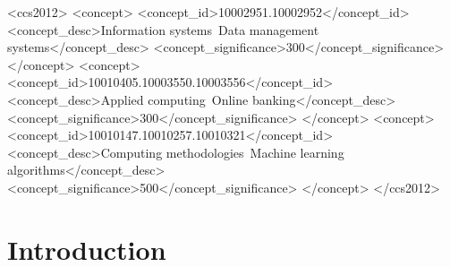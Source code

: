 \documentclass[sigconf, anonymous]{acmart}
\begin{document}
\begin{CCSXML}
<ccs2012>
   <concept>
       <concept_id>10002951.10002952</concept_id>
       <concept_desc>Information systems~Data management systems</concept_desc>
       <concept_significance>300</concept_significance>
       </concept>
   <concept>
       <concept_id>10010405.10003550.10003556</concept_id>
       <concept_desc>Applied computing~Online banking</concept_desc>
       <concept_significance>300</concept_significance>
       </concept>
   <concept>
       <concept_id>10010147.10010257.10010321</concept_id>
       <concept_desc>Computing methodologies~Machine learning algorithms</concept_desc>
       <concept_significance>500</concept_significance>
       </concept>
 </ccs2012>
\end{CCSXML}



\maketitle

\newcommand{\revised}[1]{{\color{magenta}{#1}}}

\section{Introduction} \label{sec-intro}

\end{document}
